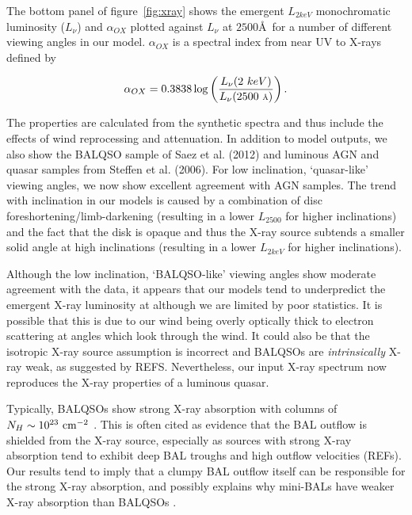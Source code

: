 \documentclass[useAMS,usenatbib]{mn2e_x}
\begin{document}
The bottom panel of figure~\ref{fig:xray} shows the emergent $L_{2keV}$ 
monochromatic luminosity ($L_\nu$) and $\alpha_{OX}$ plotted against 
$L_\nu$ at $2500$\AA\ for a number of different viewing angles in our model.
$\alpha_{OX}$ is a spectral index from near UV to X-rays defined by

\begin{equation}
\alpha_{OX}=0.3838\log\left(\frac{L_{\nu}(2~keV)}{L_{\nu}(2500~\mbox{\scriptsize{\AA}})}\right).
\end{equation}

The properties are calculated from the synthetic spectra and thus include
the effects of wind reprocessing and attenuation. In addition to model outputs,
we also show the BALQSO sample of Saez et al. (2012) and luminous AGN and quasar
samples from Steffen et al. (2006). For low inclination, `quasar-like' viewing angles,
we now show excellent agreement with AGN samples. The trend with inclination
in our models is caused by a combination of disc foreshortening/limb-darkening 
(resulting in a lower $L_{2500}$ for higher inclinations) and the fact that the disk 
is opaque and thus the X-ray source subtends a smaller solid angle at high inclinations
(resulting in a lower $L_{2keV}$ for higher inclinations). 

Although the low inclination, `BALQSO-like' viewing angles show moderate agreement with the data,
it appears that our models tend to underpredict the emergent X-ray luminosity at 
although we are limited by poor statistics. 
It is possible that this is due to our wind being overly optically thick to 
electron scattering at angles which look through the wind. It could also be that the
isotropic X-ray source assumption is incorrect and BALQSOs are {\em intrinsically} 
X-ray weak, as suggested by REFS. Nevertheless, our input X-ray spectrum
now reproduces the X-ray properties of a luminous quasar.

Typically, BALQSOs show strong X-ray absorption with columns 
of $N_H\sim10^{23}~\rm{cm^{-2}}$ 
\citep{green1996,brandt2000,mathur2000,green2001,grupemathur2003}.
This is often cited as evidence that the BAL outflow is shielded from
the X-ray source, especially as sources with strong X-ray absorption tend
to exhibit deep BAL troughs and high outflow velocities (REFs).
Our results tend to imply that a clumpy BAL outflow
itself can be responsible for the strong X-ray absorption, and possibly 
explains why mini-BALs have weaker X-ray absorption than BALQSOs 
\citep[e.g.][]{brandt2000,hamann2013}.
\end{document}
